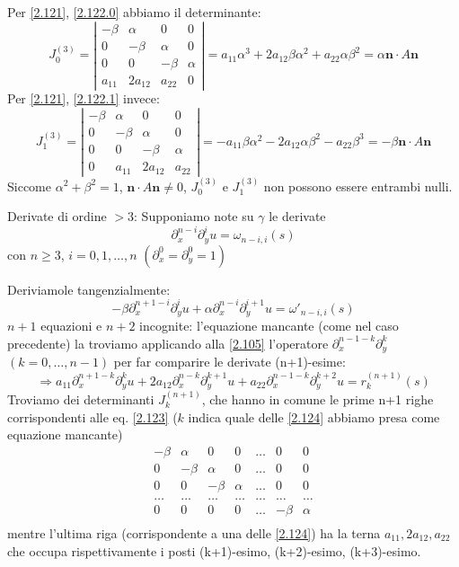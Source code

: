 \documentclass[a4paper,11pt]{report}
\newcommand{\vect}[1]{\boldsymbol{#1}}
\begin{document}
Per \eqref{2.121}, \eqref{2.122.0} abbiamo il determinante:
\[
J_0^{(3)}=\left|\begin{matrix}
-\beta & \alpha & 0 & 0\\
0 & -\beta & \alpha & 0 \\
0 & 0 & -\beta & \alpha \\
a_{11} & 2a_{12} & a_{22} & 0
\end{matrix}\right| = a_{11}\alpha^3 + 2a_{12}\beta\alpha^2 + a_{22}\alpha\beta^2 = \alpha \vect{n}\cdot A \vect{n}
\]
Per \eqref{2.121}, \eqref{2.122.1} invece: 
\[
J_1^{(3)}=\left|\begin{matrix}
-\beta & \alpha & 0 & 0\\
0 & -\beta & \alpha & 0 \\
0 & 0 & -\beta & \alpha \\
0 & a_{11} & 2a_{12} & a_{22} 
\end{matrix}\right| = -a_{11}\beta\alpha^2 - 2a_{12}\alpha\beta^2 - a_{22}\beta^3 = -\beta \vect{n}\cdot A \vect{n}
\]
Siccome $\alpha^2 + \beta^2 =1$, $\vect{n}\cdot A \vect{n}\neq 0$, $J_0^{(3)}$ e $J_1^{(3)}$ non possono essere entrambi nulli.

Derivate di ordine $>3$: Supponiamo note su $\gamma$ le derivate
\[
\partial_x^{n-i}\partial_y^i u = \omega_{n-i,i} (s)
\]
con $n\geq 3$, $i=0,1,\dots, n$ $(\partial_x^0 = \partial_y^0 = 1)$

Deriviamole tangenzialmente:
\begin{equation}
-\beta \partial_x^{n+1-i}\partial_y^{i}u +\alpha \partial_x^{n-i}\partial_y^{i+1}u = \omega'_{n-i,i}(s)
\label{2.123}
\end{equation}
$n+1$ equazioni e $n+2$ incognite: l'equazione mancante (come nel caso precedente) la troviamo applicando alla \eqref{2.105} l'operatore $\partial_x^{n-1-k}\partial_y^k$ $(k=0,\dots,n-1)$ per far comparire le derivate (n+1)-esime:
\begin{equation}
\Rightarrow a_{11}\partial_x^{n+1-k}\partial_y^k u + 2a_{12}\partial_x^{n-k}\partial_y^{k+1}u + a_{22} \partial_x^{n-1-k}\partial_y^{k+2}u = r_k^{(n+1)}(s) 
\label{2.124}
\end{equation}
Troviamo dei determinanti $J_k^{(n+1)}$, che hanno in comune le prime n+1 righe corrispondenti alle eq. \eqref{2.123}
($k$ indica quale delle \eqref{2.124} abbiamo presa come equazione mancante)
\[
\begin{matrix}
-\beta & \alpha & 0 & 0 & \dots & 0 & 0\\
0 & -\beta & \alpha & 0 & \dots & 0 & 0\\
0 & 0 &-\beta & \alpha  & \dots & 0 & 0\\
\dots & \dots & \dots & \dots & \dots & \dots & \dots \\
0 & 0 & 0 & 0 &  \dots & -\beta & \alpha\\
\end{matrix}
\]
mentre l'ultima riga (corrispondente a una delle \eqref{2.124}) ha la terna $ a_{11},2a_{12},a_{22}$ che occupa rispettivamente i posti (k+1)-esimo, (k+2)-esimo, (k+3)-esimo.
\end{document}
